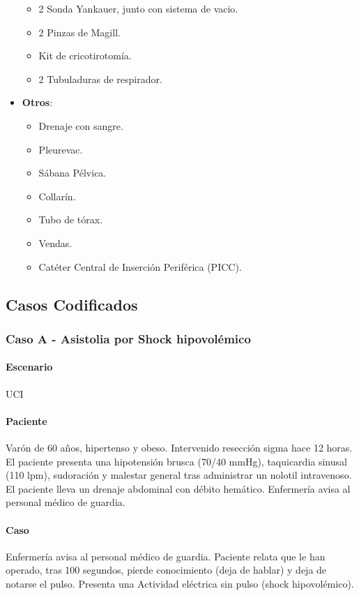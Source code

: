 \begin{itemize}[topsep=0pt, partopsep=0pt,itemsep=0pt,parsep=0pt]
\begin{itemize}[topsep=0pt, partopsep=0pt,itemsep=0pt,parsep=0pt]
        \item 2 Sonda Yankauer, junto con sistema de vacio.
        \item 2 Pinzas de Magill.
        \item Kit de cricotirotomía.
        \item 2 Tubuladuras de respirador.
    \end{itemize}
    \item \textbf{Otros}:
    \begin{itemize}[topsep=0pt, partopsep=0pt,itemsep=0pt,parsep=0pt]
        \item Drenaje con sangre.
        \item Pleurevac.
        \item Sábana Pélvica.
        \item Collarín.
        \item Tubo de tórax.
        \item Vendas.
        \item Catéter Central de Inserción Periférica (PICC).
    \end{itemize}
\end{itemize}
\subsection{Casos Codificados}
\subsubsection{Caso A - Asistolia por Shock hipovolémico}
\paragraph{Escenario} UCI
\paragraph{Paciente} Varón de 60 años, hipertenso y obeso. Intervenido resección sigma hace 12 horas. El paciente presenta una hipotensión brusca (70/40 mmHg), taquicardia sinusal (110 lpm), sudoración y malestar general tras administrar un nolotil intravenoso. El paciente lleva un drenaje abdominal con débito hemático. Enfermería avisa al personal médico de guardia.
\paragraph{Caso} Enfermería avisa al personal médico de guardia. Paciente relata que le han operado, tras 100 segundos, pierde conocimiento (deja de hablar) y deja de notarse el pulso. Presenta una Actividad eléctrica sin pulso (shock hipovolémico).

